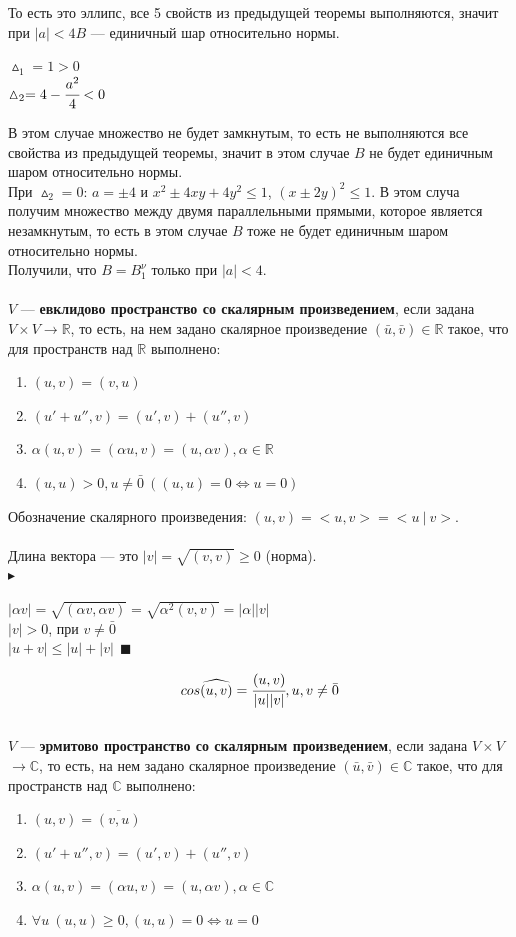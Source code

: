 \documentclass[12pt]{article}
\theoremstyle{definition}
\numberwithin{equation}{section}
\begin{document}
То есть это эллипс, все 5 свойств из предыдущей теоремы выполняются, значит при $|a| < 4 B$ --- единичный шар относительно нормы.\begin{center}
$\vartriangle_1 = 1 > 0$\\
$\vartriangle_2 = 4 - \cfrac{a^2}{4} < 0$\end{center}
В этом случае множество не будет замкнутым, то есть не выполняются все свойства из предыдущей теоремы, значит в этом случае $B$ не будет единичным шаром относительно нормы.\\
При $\vartriangle_2 = 0$: $ a = \pm 4$ и $x^2 \pm 4xy+4y^2 \leqslant 1$, $(x \pm 2y)^2 \leqslant 1$. В этом случа получим множество между двумя параллельными прямыми, которое является незамкнутым, то есть в этом случае $B$ тоже не будет единичным шаром относительно нормы.\\
Получили, что $B = B_1^{\nu}$ только при $|a| < 4$.\\
\\
$V$ --- \textbf{евклидово пространство со скалярным произведением}, если задана $V \times V \rightarrow \mathbb{R}$, то есть, на нем задано скалярное произведение $(\bar u, \bar v) \in \mathbb{R}$ такое, что для пространств над $\mathbb{R}$ выполнено:\begin{enumerate}
\item $(u, v) = (v, u)$
\item $(u'+u'', v) = (u', v)+(u'', v)$
\item $\alpha (u, v) = (\alpha u, v) = (u, \alpha v), \alpha \in \mathbb{R}$
\item $(u, u) > 0, u \neq \bar 0~ ((u, u) = 0 \Leftrightarrow u=0)$
\end{enumerate}
Обозначение скалярного произведения: $(u, v)=<u, v>=<u~|~v>$.\\ \\
Длина вектора --- это $|v| = \sqrt{(v, v)} \geqslant 0$ (норма).\\
$\blacktriangleright$ \begin{center}$|\alpha v| = \sqrt{(\alpha v, \alpha v)} = \sqrt{\alpha^2 (v, v)} = |\alpha||v|$\\
$|v| > 0$, при $v \neq \bar 0$\\
$|u+v| \leqslant |u|+|v| ~~\blacksquare$\end{center}
$$cos \widehat{(u, v)} = \cfrac{(u, v)}{|u||v|}, u, v \neq \bar 0$$\\
$V$ --- \textbf{эрмитово пространство со скалярным произведением}, если задана $V \times V$ $\rightarrow \mathbb{C}$, то есть, на нем задано скалярное произведение $(\bar u, \bar v) \in \mathbb{C}$ такое, что для пространств над $\mathbb{C}$ выполнено:\begin{enumerate}
\item $(u, v) = \overline{(v, u)}$
\item $(u'+u'', v) = (u', v)+(u'', v)$
\item $\alpha (u, v) = (\alpha u, v) = (u, \alpha v), \alpha \in \mathbb{C}$
\item $\forall u~ (u, u) \geqslant 0, (u, u) = 0 \Leftrightarrow u=0$
\end{enumerate}
\end{document}
